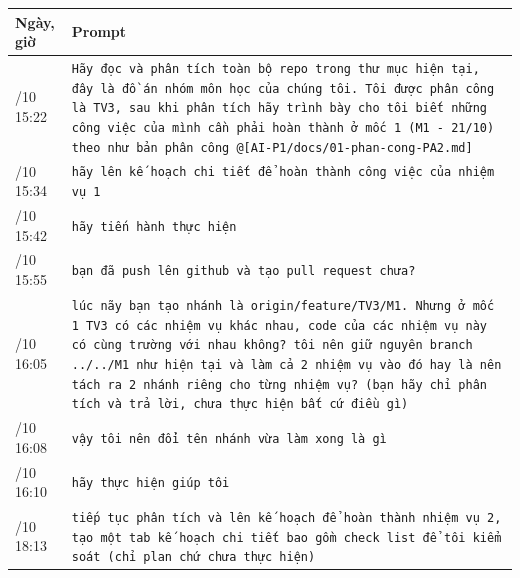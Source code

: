 {\def\LTcaptype{none} %
\begin{longtable}[]{@{}
  >{\raggedright\arraybackslash}p{}
  >{\raggedright\arraybackslash}p{}@{}}
\toprule\noalign{}
\rowcolor{tablehead}\begin{minipage}[b]{\linewidth}\raggedright
\textbf{Ngày, giờ}
\end{minipage} & \begin{minipage}[b]{\linewidth}\raggedright
\textbf{Prompt}
\end{minipage} \\
\midrule\noalign{}
\endhead
\bottomrule\noalign{}
\endlastfoot
21/10 15:22 & \texttt{Hãy đọc và phân tích toàn bộ repo trong thư mục hiện tại, đây là đồ án nhóm môn học của chúng tôi.\allowbreak{} Tôi được phân công là TV3, sau khi phân tích hãy trình bày cho tôi biết những công việc của mình cần phải hoàn thành ở mốc 1 (M1 -\allowbreak{} 21/\allowbreak{}10) theo như bản phân công @[AI-\allowbreak{}P1/\allowbreak{}docs/\allowbreak{}01-\allowbreak{}phan-\allowbreak{}cong-\allowbreak{}PA2.\allowbreak{}md]} \\
\rowrule
21/10 15:34 & \texttt{hãy lên kế hoạch chi tiết để hoàn thành công việc của nhiệm vụ 1} \\
\rowrule
21/10 15:42 & \texttt{hãy tiến hành thực hiện} \\
\rowrule
21/10 15:55 & \texttt{bạn đã push lên github và tạo pull request chưa?} \\
\rowrule
21/10 16:05 & \texttt{lúc nãy bạn tạo nhánh là origin/\allowbreak{}feature/\allowbreak{}TV3/\allowbreak{}M1.\allowbreak{} Nhưng ở mốc 1 TV3 có các nhiệm vụ khác nhau, code của các nhiệm vụ này có cùng trường với nhau không? tôi nên giữ nguyên branch .\allowbreak{}.\allowbreak{}/\allowbreak{}.\allowbreak{}.\allowbreak{}/\allowbreak{}M1 như hiện tại và làm cả 2 nhiệm vụ vào đó hay là nên tách ra 2 nhánh riêng cho từng nhiệm vụ? (bạn hãy chỉ phân tích và trả lời, chưa thực hiện bất cứ điều gì)} \\
\rowrule
21/10 16:08 & \texttt{vậy tôi nên đổi tên nhánh vừa làm xong là gì} \\
\rowrule
21/10 16:10 & \texttt{hãy thực hiện giúp tôi} \\
\rowrule
21/10 18:13 & \texttt{tiếp tục phân tích và lên kế hoạch để hoàn thành nhiệm vụ 2, tạo một tab kế hoạch chi tiết bao gồm check list để tôi kiểm soát (chỉ plan chứ chưa thực hiện)} \\

\end{longtable}}
